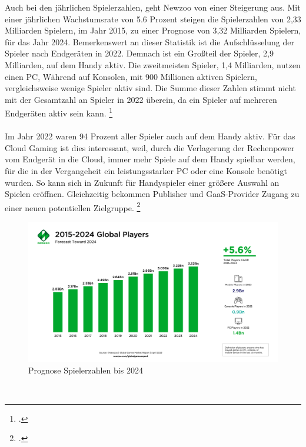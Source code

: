 \documentclass[12pt,toc=bib,toc=listof]{scrreprt}
\begin{document}
Auch bei den jährlichen Spielerzahlen, geht Newzoo von einer Steigerung aus. Mit einer jährlichen 
Wachstumsrate von 5.6 Prozent steigen die Spielerzahlen von 2,33 Milliarden Spielern, im Jahr 2015,
zu einer Prognose von 3,32 Milliarden Spielern, für das Jahr 2024. Bemerkenswert an dieser Statistik
ist die Aufschlüsselung der Spieler nach Endgeräten in 2022. Demnach ist ein Großteil der Spieler, 
2,9 Milliarden, auf dem Handy aktiv. Die zweitmeisten Spieler, 1,4 Milliarden, nutzen einen PC, Während
auf Konsolen, mit 900 Millionen aktiven Spielern, vergleichsweise wenige Spieler aktiv sind. 
Die Summe dieser Zahlen stimmt nicht mit der Gesamtzahl an Spieler in 2022 überein, da ein Spieler 
auf mehreren Endgeräten aktiv sein kann. \footcite [Vgl.] [] {Newzoo.2022}
\\ \\
Im Jahr 2022 waren 94 Prozent aller Spieler auch auf dem Handy aktiv. Für das Cloud Gaming ist dies interessant,
weil, durch die Verlagerung der Rechenpower vom Endgerät in die Cloud, immer mehr Spiele auf dem Handy spielbar werden, für
die in der Vergangeheit ein leistungsstarker PC oder eine Konsole benötigt wurden. So kann sich in Zukunft für Handyspieler 
einer größere Auswahl an Spielen eröffnen. Gleichzeitig bekommen Publisher und GaaS-Provider Zugang zu einer neuen potentiellen
Zielgruppe. \footcite [Vgl.] [] {Newzoo.2022}
\\%
\begin{figure}[h]
 \centering
  \includegraphics[scale=0.12]{Abbildungen/Newzoo_Global_Players_Forecast.png} 
  \caption[Newzoo 2022]{Prognose Spielerzahlen bis 2024}
\end{figure}
\\%
\end{document}
